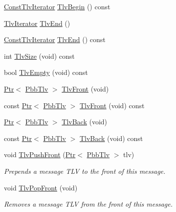 \begin{DoxyCompactItemize}
\item 
\hyperlink{classns3_1_1PbbMessage_a61799e261fbd64220103731f0cc07594}{Const\+Tlv\+Iterator} \hyperlink{classns3_1_1PbbMessage_ae3f94ad6668da07cf01f86e97cc701fc}{Tlv\+Begin} () const 
\item 
\hyperlink{classns3_1_1PbbMessage_ac37cff092f8d01346e2d9498b4b34afd}{Tlv\+Iterator} \hyperlink{classns3_1_1PbbMessage_ae86cc35bbc87659cebbeed53d63d5357}{Tlv\+End} ()
\item 
\hyperlink{classns3_1_1PbbMessage_a61799e261fbd64220103731f0cc07594}{Const\+Tlv\+Iterator} \hyperlink{classns3_1_1PbbMessage_a5cd72e4158a5fb163c031171e49a6947}{Tlv\+End} () const 
\item 
int \hyperlink{classns3_1_1PbbMessage_a55e2bf69a8f213d2146af80ce9ae0972}{Tlv\+Size} (void) const 
\item 
bool \hyperlink{classns3_1_1PbbMessage_a73c6185a2d2624c0d53ef6f33c960b8f}{Tlv\+Empty} (void) const 
\item 
\hyperlink{classns3_1_1Ptr}{Ptr}$<$ \hyperlink{classns3_1_1PbbTlv}{Pbb\+Tlv} $>$ \hyperlink{classns3_1_1PbbMessage_ad985c7df0f8a5b4ab46d125f225bc5c1}{Tlv\+Front} (void)
\item 
const \hyperlink{classns3_1_1Ptr}{Ptr}$<$ \hyperlink{classns3_1_1PbbTlv}{Pbb\+Tlv} $>$ \hyperlink{classns3_1_1PbbMessage_a2097e10d461b56587cc46148766585d5}{Tlv\+Front} (void) const 
\item 
\hyperlink{classns3_1_1Ptr}{Ptr}$<$ \hyperlink{classns3_1_1PbbTlv}{Pbb\+Tlv} $>$ \hyperlink{classns3_1_1PbbMessage_a4a69971743a5dc340befb50f203f3c0d}{Tlv\+Back} (void)
\item 
const \hyperlink{classns3_1_1Ptr}{Ptr}$<$ \hyperlink{classns3_1_1PbbTlv}{Pbb\+Tlv} $>$ \hyperlink{classns3_1_1PbbMessage_a47a224ec8b2eeead127067c919b5f7cd}{Tlv\+Back} (void) const 
\item 
void \hyperlink{classns3_1_1PbbMessage_a254143cfe16eb20a3118da21b76b9e46}{Tlv\+Push\+Front} (\hyperlink{classns3_1_1Ptr}{Ptr}$<$ \hyperlink{classns3_1_1PbbTlv}{Pbb\+Tlv} $>$ tlv)
\begin{DoxyCompactList}\small\item\em Prepends a message T\+LV to the front of this message. \end{DoxyCompactList}\item 
void \hyperlink{classns3_1_1PbbMessage_a859f060dab1aae875ae090b5ed3b505a}{Tlv\+Pop\+Front} (void)
\begin{DoxyCompactList}\small\item\em Removes a message T\+LV from the front of this message. \end{DoxyCompactList}\item 

\end{DoxyCompactItemize}
